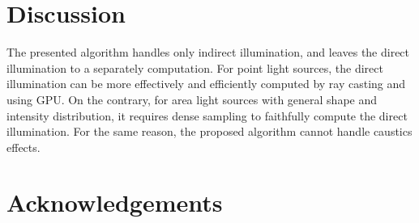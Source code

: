 \documentclass[review]{acmsiggraph}
\begin{document}
\section{Discussion}

The presented algorithm handles only indirect illumination, and leaves the direct illumination to a separately computation. For point light sources, the direct illumination can be more effectively and efficiently computed by ray casting and using GPU. On the contrary, for area light sources with general shape and intensity distribution, it requires dense sampling to faithfully compute the direct illumination. For the same reason, the proposed algorithm cannot handle caustics effects.

\section*{Acknowledgements}


\nocite{*}

\end{document}

